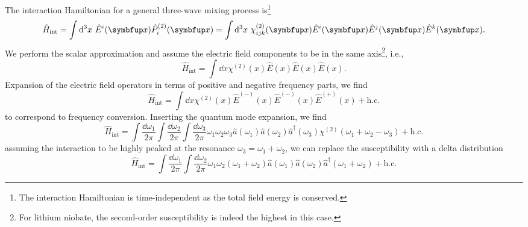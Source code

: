 The interaction Hamiltonian for a general three-wave mixing process is\footnote{The interaction Hamiltonian is time-independent as the total field energy is conserved.}
\begin{equation}
	\hat{H}_\text{int}
	=
	\int\dd[3]{x}
	\hat{E}^i(\vb{x})
	\hat{P}_i^{(2)}(\vb{x})
	=
	\int\dd[3]{x}
	\chi^{(2)}_{ijk}(\vb{x})
	\hat{E}^i(\vb{x})
	\hat{E}^j(\vb{x})
	\hat{E}^k(\vb{x})
	.
\end{equation}
We perform the scalar approximation and assume the electric field components to be in the same axis\footnote{For lithium niobate, the second-order susceptibility is indeed the highest in this case.}, i.e.,
\begin{equation}
	\hat{H}_\text{int}
	=
	\int\dd{x}
	\chi^{(2)}(x)
	\hat{E}(x)
	\hat{E}(x)
	\hat{E}(x)
	.
\end{equation}
Expansion of the electric field operators in terms of positive and negative frequency parts, we find
\begin{equation}
	\hat{H}_\text{int}
	=
	\int\dd{x}
	\chi^{(2)}(x)
	\hat{E}^{(-)}(x)
	\hat{E}^{(-)}(x)
	\hat{E}^{(+)}(x)
	+
	\text{h.c.}
\end{equation}
to correspond to frequency conversion.
Inserting the quantum mode expansion, we find
\begin{equation}
	\hat{H}_\text{int}
	=
	\int\frac{\dd{\omega_1}}{2\pi}
	\int\frac{\dd{\omega_2}}{2\pi}
	\int\frac{\dd{\omega_3}}{2\pi}
	\omega_1
	\omega_2
	\omega_3
	\hat{a}(\omega_1)
	\hat{a}(\omega_2)
	\hat{a}^\dagger(\omega_3)
	\chi^{(2)}(\omega_1+\omega_2-\omega_3)
	+
	\text{h.c.}
\end{equation}
assuming the interaction to be highly peaked at the resonance $\omega_3=\omega_1+\omega_2$, we can replace the susceptibility with a delta distribution
\begin{equation}
	\hat{H}_\text{int}
	=
	\int\frac{\dd{\omega_1}}{2\pi}
	\int\frac{\dd{\omega_2}}{2\pi}
	\omega_1
	\omega_2
	\left(\omega_1+\omega_2\right)
	\hat{a}(\omega_1)
	\hat{a}(\omega_2)
	\hat{a}^\dagger(\omega_1+\omega_2)
	+
	\text{h.c.}
\end{equation}
